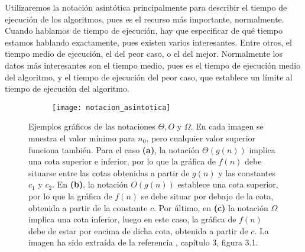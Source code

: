 Utilizaremos la notación asintótica principalmente para describir el tiempo de ejecución de los algoritmos, pues es el recurso más importante, normalmente. \\

Cuando hablamos de tiempo de ejecución, hay que especificar de qué tiempo estamos hablando exactamente, pues existen varios interesantes. Entre otros, el tiempo medio de ejecución, el del peor caso, o el del mejor. Normalmente los datos más interesantes son el tiempo medio, pues es el tiempo de ejecución medio del algoritmo, y el tiempo de ejecución del peor caso, que establece un límite al tiempo de ejecución del algoritmo.

\begin{figure}[!htb]
	\centering
	\begin{subfigure}{\linewidth}
		\texttt{[image: notacion\_asintotica]}
	\end{subfigure}
	
	\caption{Ejemplos gráficos de las notaciones $\Theta,O$ y $\Omega$. En cada imagen se muestra el valor mínimo para $n_0$, pero cualquier valor superior funciona también. Para el caso \textbf{(a)}, la notación $\Theta(g(n))$ implica una cota superior e inferior, por lo que la gráfica de $f(n)$ debe situarse entre las cotas obtenidas a partir de $g(n)$ y las constantes $c_1$ y $c_2$. En \textbf{(b)}, la notación $O(g(n))$ establece una cota superior, por lo que la gráfica de $f(n)$ se debe situar por debajo de la cota, obtenida a partir de la constante $c$. Por último, en \textbf{(c)} la notación $\Omega$ implica una cota inferior, luego en este caso, la gráfica de $f(n)$ debe de estar por encima de dicha cota, obtenida a partir de $c$. La imagen ha sido extraída de la referencia \cite{algorithms}, capítulo 3, figura 3.1.}
	\label{fig:notacion_asintotica}
\end{figure}


\endinput



